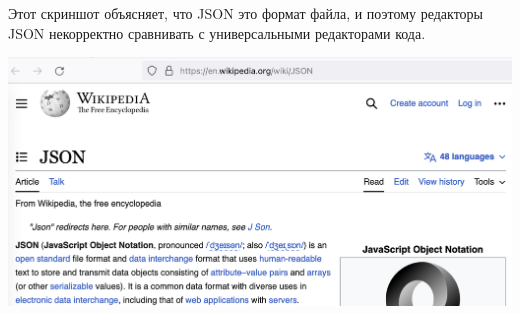 
Этот скриншот объясняет, что JSON это формат файла,
и поэтому редакторы JSON некорректно сравнивать с универсальными редакторами кода.

\begin{center}
    \includegraphics[width=\textwidth]{json}
\end{center}

\pagebreak
